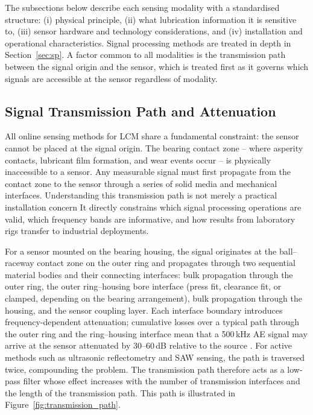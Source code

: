 \noindent The subsections below describe each sensing modality with a standardised structure: (i) physical principle, (ii) what lubrication information it is sensitive to, (iii) sensor hardware and technology considerations, and (iv) installation and operational characteristics. Signal processing methods are treated in depth in Section~\ref{sec:sp}. A factor common to all modalities is the transmission path between the signal origin and the sensor, which is treated first as it governs which signals are accessible at the sensor regardless of modality.

\subsection{Signal Transmission Path and Attenuation}
\label{subsec:transmission}

All online sensing methods for LCM share a fundamental constraint: the sensor cannot be placed at the signal origin. The bearing contact zone -- where asperity contacts, lubricant film formation, and wear events occur -- is physically inaccessible to a sensor. Any measurable signal must first propagate from the contact zone to the sensor through a series of solid media and mechanical interfaces. Understanding this transmission path is not merely a practical installation concern It directly constrains which signal processing operations are valid, which frequency bands are informative, and how results from laboratory rigs transfer to industrial deployments.

For a sensor mounted on the bearing housing, the signal originates at the ball--raceway contact zone on the outer ring and propagates through two sequential material bodies and their connecting interfaces: bulk propagation through the outer ring, the outer ring--housing bore interface (press fit, clearance fit, or clamped, depending on the bearing arrangement), bulk propagation through the housing, and the sensor coupling layer. Each interface boundary introduces frequency-dependent attenuation; cumulative losses over a typical path through the outer ring and the ring--housing interface mean that a 500\,kHz AE signal may arrive at the sensor attenuated by 30--60\,dB relative to the source \cite{ono_comprehensive_2020,scheeren_evaluation_2022}. For active methods such as ultrasonic reflectometry and SAW sensing, the path is traversed twice, compounding the problem. The transmission path therefore acts as a low-pass filter whose effect increases with the number of transmission interfaces and the length of the transmission path. This path is illustrated in Figure~\ref{fig:transmission_path}.

